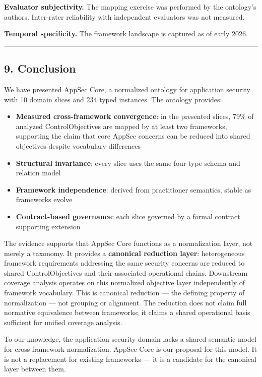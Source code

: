 \documentclass[
]{article}
\providecommand{\tightlist}{%
  \setlength{\itemsep}{0pt}\setlength{\parskip}{0pt}}
\begin{document}
\textbf{Evaluator subjectivity.} The mapping exercise was performed by
the ontology's authors. Inter-rater reliability with independent
evaluators was not measured.

\textbf{Temporal specificity.} The framework landscape is captured as of
early 2026.

\begin{center}\rule{0.5\linewidth}{0.5pt}\end{center}

\subsection{9. Conclusion}\label{conclusion}

We have presented AppSec Core, a normalized ontology for application
security with 10 domain slices and 234 typed instances. The ontology
provides:

\begin{itemize}
\tightlist
\item
  \textbf{Measured cross-framework convergence}: in the presented
  slices, 79\% of analyzed ControlObjectives are mapped by at least two
  frameworks, supporting the claim that core AppSec concerns can be
  reduced into shared objectives despite vocabulary differences
\item
  \textbf{Structural invariance}: every slice uses the same four-type
  schema and relation model
\item
  \textbf{Framework independence}: derived from practitioner semantics,
  stable as frameworks evolve
\item
  \textbf{Contract-based governance}: each slice governed by a formal
  contract supporting extension
\end{itemize}

The evidence supports that AppSec Core functions as a normalization
layer, not merely a taxonomy. It provides a \textbf{canonical reduction
layer}: heterogeneous framework requirements addressing the same
security concerns are reduced to shared ControlObjectives and their
associated operational chains. Downstream coverage analysis operates on
this normalized objective layer independently of framework vocabulary.
This is canonical reduction --- the defining property of normalization
--- not grouping or alignment. The reduction does not claim full
normative equivalence between frameworks; it claims a shared operational
basis sufficient for unified coverage analysis.

To our knowledge, the application security domain lacks a shared
semantic model for cross-framework normalization. AppSec Core is our
proposal for this model. It is not a replacement for existing frameworks
--- it is a candidate for the canonical layer between them.
\end{document}
